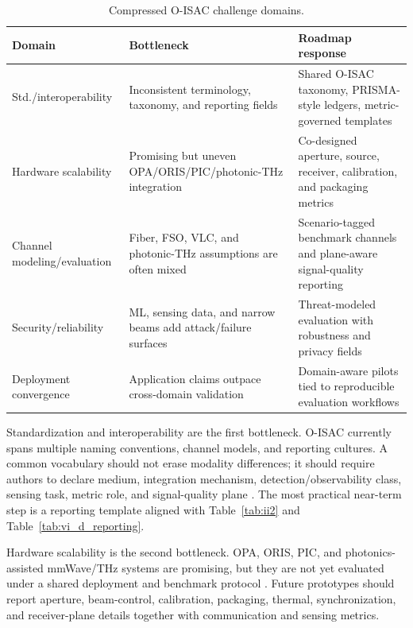 \documentclass[letterpaper,journal]{IEEEtran}
\begin{document}
\begin{table}[!t]
    \caption{Compressed O-ISAC challenge domains.}
    \label{tab:challenge_compact}
    \centering
    \scriptsize
    \setlength{\tabcolsep}{2.8pt}
    \renewcommand{\arraystretch}{1.08}
    \begin{tabularx}{\textwidth}{@{}L{2.4cm}L{3.0cm}Y@{}}
        \toprule
        Domain & Bottleneck & Roadmap response \\
        \midrule
        Std./interoperability & Inconsistent terminology, taxonomy, and reporting fields & Shared O-ISAC taxonomy, PRISMA-style ledgers, metric-governed templates \\
        Hardware scalability & Promising but uneven OPA/ORIS/PIC/photonic-THz integration & Co-designed aperture, source, receiver, calibration, and packaging metrics \\
        Channel modeling/evaluation & Fiber, FSO, VLC, and photonic-THz assumptions are often mixed & Scenario-tagged benchmark channels and plane-aware signal-quality reporting \\
        Security/reliability & ML, sensing data, and narrow beams add attack/failure surfaces & Threat-modeled evaluation with robustness and privacy fields \\
        Deployment convergence & Application claims outpace cross-domain validation & Domain-aware pilots tied to reproducible evaluation workflows \\
        \bottomrule
    \end{tabularx}
\end{table}

Standardization and interoperability are the first bottleneck. O-ISAC currently spans multiple naming conventions, channel models, and reporting cultures. A common vocabulary should not erase modality differences; it should require authors to declare medium, integration mechanism, detection/observability class, sensing task, metric role, and signal-quality plane \cite{O_ISAC_161,O_ISAC_162,O_ISAC_327}. The most practical near-term step is a reporting template aligned with Table~\ref{tab:ii2} and Table~\ref{tab:vi_d_reporting}.

Hardware scalability is the second bottleneck. OPA, ORIS, PIC, and photonics-assisted mmWave/THz systems are promising, but they are not yet evaluated under a shared deployment and benchmark protocol \cite{O_ISAC_008,O_ISAC_036,O_ISAC_061,O_ISAC_091,O_ISAC_145,O_ISAC_163}. Future prototypes should report aperture, beam-control, calibration, packaging, thermal, synchronization, and receiver-plane details together with communication and sensing metrics.
\end{document}
